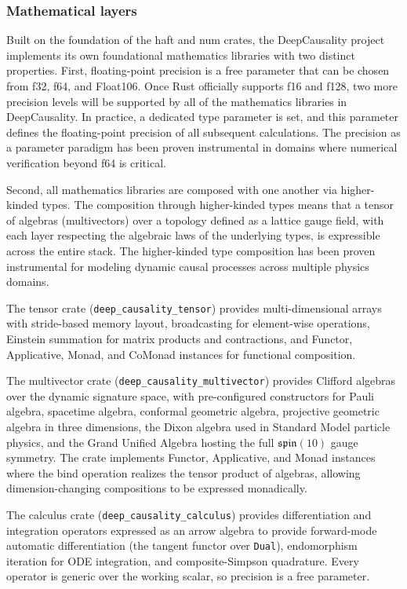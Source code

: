 \subsubsection{Mathematical layers}

Built on the foundation of the haft and num crates, the DeepCausality project implements its own foundational mathematics libraries with two distinct properties.
First, floating-point precision is a free parameter that can be chosen from f32, f64, and Float106. Once Rust officially supports f16 and f128, two more precision levels will be supported by all of the mathematics libraries in DeepCausality. In practice, a dedicated type parameter is set, and this parameter defines the floating-point precision of all subsequent calculations. The precision as a parameter paradigm has been proven instrumental in domains where numerical verification beyond f64 is critical.

Second, all mathematics libraries are composed with one another via higher-kinded types. The composition through higher-kinded types means that a tensor of algebras (multivectors) over a topology defined as a lattice gauge field, with each layer respecting the algebraic laws of the underlying types, is expressible across the entire stack. The higher-kinded type composition has been proven instrumental for modeling dynamic causal processes across multiple physics domains.

The tensor crate (\texttt{deep\_causality\_tensor}) provides multi-dimensional arrays with stride-based memory layout, broadcasting for element-wise operations, Einstein summation for matrix products and contractions, and Functor, Applicative, Monad, and CoMonad instances for functional composition.

The multivector crate (\texttt{deep\_causality\_multivector}) provides Clifford algebras over the dynamic signature space, with pre-configured constructors for Pauli algebra, spacetime algebra, conformal geometric algebra, projective geometric algebra in three dimensions, the Dixon algebra used in Standard Model particle physics, and the Grand Unified Algebra hosting the full $\mathfrak{spin}(10)$ gauge symmetry. The crate implements Functor, Applicative, and Monad instances where the bind operation realizes the tensor product of algebras, allowing dimension-changing compositions to be expressed monadically.

The calculus crate (\texttt{deep\_causality\_calculus}) provides differentiation and integration operators expressed as an arrow algebra to provide forward-mode automatic differentiation (the tangent functor over \texttt{Dual}),
endomorphism iteration for ODE integration, and composite-Simpson quadrature. Every operator is generic over the working scalar, so precision is a free parameter.


